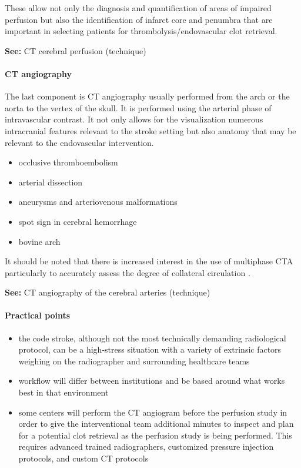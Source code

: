 These allow not only the diagnosis and quantification of areas of impaired perfusion but also the identification of infarct core and penumbra that are important in selecting patients for thrombolysis/endovascular clot retrieval.

\textbf{See:} CT cerebral perfusion (technique)

\paragraph{CT angiography}

The last component is CT angiography usually performed from the arch or the aorta to the vertex of the skull. It is performed using the arterial phase of intravascular contrast. It not only allows for the visualization numerous intracranial features relevant to the stroke setting but also anatomy that may be relevant to the endovascular intervention.

\begin{itemize}
	\item
	occlusive thromboembolism
	\item
	arterial dissection
	\item
	aneurysms and arteriovenous malformations
	\item
	spot sign in cerebral hemorrhage
	\item
	bovine arch
\end{itemize}

It should be noted that there is increased interest in the use of multiphase CTA particularly to accurately assess the degree of collateral circulation .

\textbf{See:} CT angiography of the cerebral arteries (technique)

\paragraph{Practical points}

\begin{itemize}
	\item
	the code stroke, although not the most technically demanding radiological protocol, can be a high-stress situation with a variety of extrinsic factors weighing on the radiographer and surrounding healthcare teams
	\item
	workflow will differ between institutions and be based around what works best in that environment
	\item
	some centers will perform the CT angiogram before the perfusion study in order to give the interventional team additional minutes to inspect and plan for a potential clot retrieval as the perfusion study is being performed. This requires advanced trained radiographers, customized pressure injection protocols, and custom CT protocols
\end{itemize}

